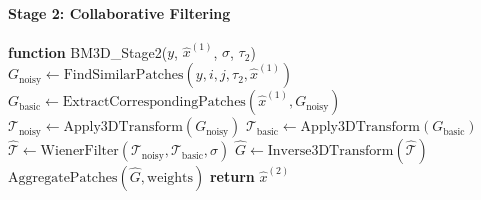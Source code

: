 \documentclass[12pt]{article}
\begin{document}
\paragraph{Stage 2: Collaborative Filtering}
\begin{algorithmic}[1]
    \STATE \textbf{function} BM3D\_Stage2($y$, $\hat{x}^{(1)}$, $\sigma$, $\tau_2$)
    \STATE $G_{\text{noisy}} \leftarrow \text{FindSimilarPatches}(y, i, j, \tau_2, \hat{x}^{(1)})$
    \STATE $G_{\text{basic}} \leftarrow \text{ExtractCorrespondingPatches}(\hat{x}^{(1)}, G_{\text{noisy}})$
    \STATE $\mathcal{T}_{\text{noisy}} \leftarrow \text{Apply3DTransform}(G_{\text{noisy}})$
    \STATE $\mathcal{T}_{\text{basic}} \leftarrow \text{Apply3DTransform}(G_{\text{basic}})$
    \STATE $\hat{\mathcal{T}} \leftarrow \text{WienerFilter}(\mathcal{T}_{\text{noisy}}, \mathcal{T}_{\text{basic}}, \sigma)$
    \STATE $\hat{G} \leftarrow \text{Inverse3DTransform}(\hat{\mathcal{T}})$
    \STATE $\text{AggregatePatches}(\hat{G}, \text{weights})$
    \ENDFOR
    \STATE \textbf{return} $\hat{x}^{(2)}$
\end{algorithmic}
\end{document}
